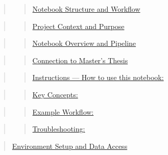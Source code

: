 \documentclass[
  letterpaper,
]{book}
\begin{document}
\begin{quote}
\begin{quote}
\hyperref[scrollTo=iDy_leH6DJH_]{Notebook Structure and Workflow}
\end{quote}
\end{quote}

\begin{quote}
\begin{quote}
\hyperref[scrollTo=Cm1JQGDYNJjf]{Project Context and Purpose}
\end{quote}
\end{quote}

\begin{quote}
\begin{quote}
\hyperref[scrollTo=Cm1JQGDYNJjf]{Notebook Overview and Pipeline}
\end{quote}
\end{quote}

\begin{quote}
\begin{quote}
\hyperref[scrollTo=Cm1JQGDYNJjf]{Connection to Master's Thesis}
\end{quote}
\end{quote}

\begin{quote}
\begin{quote}
\hyperref[scrollTo=22NBzTxxsnfQ]{Instructions --- How to use this
notebook:}
\end{quote}
\end{quote}

\begin{quote}
\begin{quote}
\hyperref[scrollTo=NovjnOw6bzLi]{Key Concepts:}
\end{quote}
\end{quote}

\begin{quote}
\begin{quote}
\hyperref[scrollTo=NovjnOw6bzLi]{Example Workflow:}
\end{quote}
\end{quote}

\begin{quote}
\begin{quote}
\hyperref[scrollTo=NovjnOw6bzLi]{Troubleshooting:}
\end{quote}
\end{quote}

\begin{quote}
\hyperref[scrollTo=neYYoWhbNRIJ]{Environment Setup and Data Access}
\end{quote}
\end{document}
